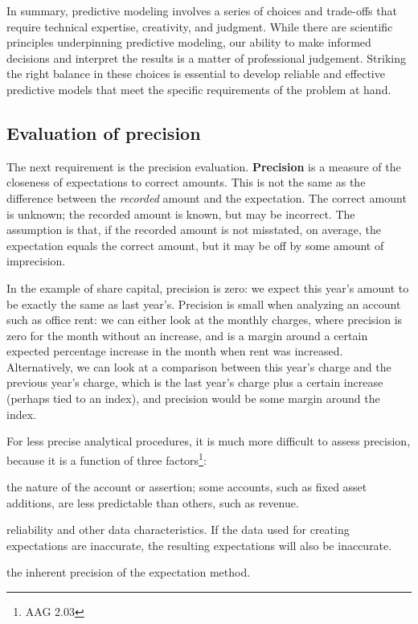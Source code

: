 \bigskip
In summary, predictive modeling involves a series of choices and trade-offs that require technical expertise, creativity, and judgment. While there are scientific principles underpinning predictive modeling, our ability to make informed decisions and interpret the results is a matter of professional judgement. Striking the right balance in these choices is essential to develop reliable and effective predictive models that meet the specific requirements of the problem at hand.


\subsection{Evaluation of precision} %
\label{sub:evaluation_of_precision}

The next requirement is the precision evaluation. \textbf{Precision} is a measure of the closeness of expectations to correct amounts. 
This is not the same as the difference between the \emph{recorded} amount and the expectation. 
The correct amount is unknown; the recorded amount is known, but may be incorrect. 
The assumption is that, if the recorded amount is not misstated, on average, the expectation equals the correct amount, but it may be off by some amount of imprecision.

In the example of share capital, precision is zero: we expect this year's amount to be exactly the same as last year's. Precision is small when analyzing an account such as office rent: we can either look at the monthly charges, where precision is zero for the month without an increase, and is a margin around a certain expected percentage increase in the month when rent was increased. Alternatively, we can look at a comparison between this year’s charge and the previous year’s charge, which is the last year’s charge plus a certain increase (perhaps tied to an index), and precision would be some margin around the index.

\bigskip
For less precise analytical procedures, it is much more difficult to assess precision, because it is a function of three factors\footnote{AAG 2.03}:
\begin{compactitem}
\item the nature of the account or assertion; some accounts, such as fixed asset additions, are less predictable than others, such as revenue.
\item reliability and other data characteristics. If the data used for creating expectations are inaccurate, the resulting expectations will also be inaccurate.
\item the inherent precision of the expectation method.
\end{compactitem} 

